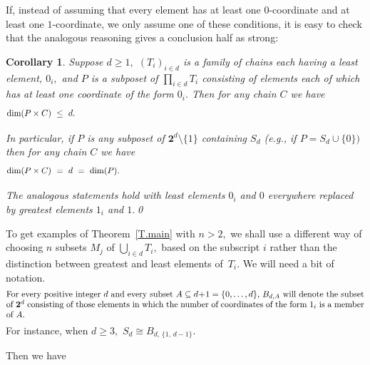 \documentclass{amsart}
\newtheorem{corollary}[theorem]{Corollary}
\numberwithin{equation}{section}
\numberwithin{theorem}{section}
\newcommand{\2}{\mathbf{2}}
\begin{document}
If, instead of assuming that every element
has at least one  $\!0\!$-coordinate and
at least one  $\!1\!$-coordinate, we only assume one of these
conditions, it is easy to check that the analogous reasoning
gives a conclusion half as strong:

\begin{corollary}\label{C.0}
Suppose $d\geq 1,$ $(T_i)_{i\in d}$ is a family of chains each
having a least element, $0_i,$
and $P$ is a subposet of $\prod_{i\in d} T_i$ consisting of
elements each of which has at least one coordinate of the form $0_i.$
Then for any chain $C$ we have
%
\begin{equation}\begin{minipage}[c]{35pc}\label{d.dimPxC}
$\dim(P\times C)\ \leq\ d.$
\end{minipage}\end{equation}

In particular, if $P$ is any subposet of $\2^d\setminus \{1\}$
containing $S_d$ \textup{(}e.g., if $P=S_d\cup\{0\})$
then for any chain $C$ we have
%
\begin{equation}\begin{minipage}[c]{35pc}\label{d.dimPxC=}
$\dim(P\times C)\ =\ d\ =\ \dim(P).$
\end{minipage}\end{equation}

The analogous statements hold with least elements $0_i$ and $0$
everywhere replaced by greatest elements $1_i$ and $1.$\qed
\end{corollary}

To get examples of Theorem~\ref{T.main}
with $n>2,$ we shall use a different way of choosing $n$ subsets
$M_j$ of $\bigcup_{i\in d} T_i,$ based on the subscript $i$ rather
than the distinction between greatest and least elements of~$T_i.$
We will need a bit of notation.
%
\begin{equation}\begin{minipage}[c]{35pc}\label{d.PdA}
For every positive integer $d$ and every subset
$A\subseteq d\!+\!1=\{0,\dots,d\},$
$B_{d,A}$ will denote the subset of $\2^d$ consisting
of those elements in which the number of coordinates
of the form $1_i$ is a member of~$A.$
\end{minipage}\end{equation}
%
For instance, when $d\geq 3,$ $S_d\cong B_{d,\,\{1,\,d-1\}}.$

Then we have
\end{document}
